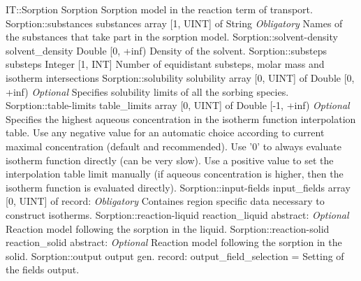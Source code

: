 \begin{RecordType}
	{IT::Sorption}
	{Sorption}
	{}%
	{}%
	{{{Sorption model in the reaction term of transport.}%
}}
		\RecKey
			{Sorption::substances}
			{substances}
			{{array [1, UINT] of }{String}}{}
			{ \it{Obligatory}}
			{{{Names of the substances that take part in the sorption model.}%
}}
		\RecKey
			{Sorption::solvent-density}
			{solvent{\_}density}
			{{Double [0, +inf)}}{}
			{ }
			{{{Density of the solvent.}%
}}
		\RecKey
			{Sorption::substeps}
			{substeps}
			{{Integer [1, INT]}}{}
			{ }
			{{{Number of equidistant substeps, molar mass and isotherm intersections}%
}}
		\RecKey
			{Sorption::solubility}
			{solubility}
			{{array [0, UINT] of }{Double [0, +inf)}}{}
			{ \it{Optional}}
			{{{Specifies solubility limits of all the sorbing species.}%
}}
		\RecKey
			{Sorption::table-limits}
			{table{\_}limits}
			{{array [0, UINT] of }{Double [-1, +inf)}}{}
			{ \it{Optional}}
			{{{Specifies the highest aqueous concentration in the isotherm function interpolation table.
Use any negative value for an automatic choice according to current maximal concentration (default and recommended). Use '0' to always evaluate isotherm function directly (can be very slow). Use a positive value to set the interpolation table limit manually (if aqueous concentration is higher, then the isotherm function is evaluated directly).}%
}}
		\RecKey
			{Sorption::input-fields}
			{input{\_}fields}
			{{array [0, UINT] of }{record: }}{}
			{ \it{Obligatory}}
			{{{Containes region specific data necessary to construct isotherms.}%
}}
		\RecKey
			{Sorption::reaction-liquid}
			{reaction{\_}liquid}
			{{abstract: }}{}
			{ \it{Optional}}
			{{{Reaction model following the sorption in the liquid.}%
}}
		\RecKey
			{Sorption::reaction-solid}
			{reaction{\_}solid}
			{{abstract: }}{}
			{ \it{Optional}}
			{{{Reaction model following the sorption in the solid.}%
}}
		\RecKey
			{Sorption::output}
			{output}
			{{gen. record: }}{{output{\_}field{\_}selection}{ = }}
			{ }
			{{{Setting of the fields output.}%
}}
\end{RecordType}

